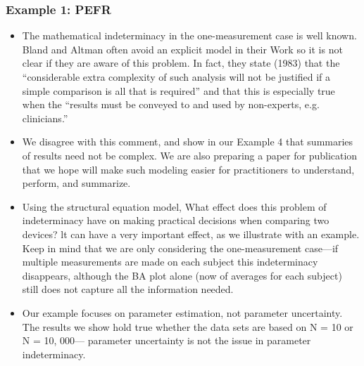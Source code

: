 \documentclass[]{article}
\title{}
\author{}
\begin{document}
\subsubsection{Example 1: PEFR}
\begin{itemize}
\item	The mathematical indeterminacy in the one-measurement case is well known. Bland
	and Altman often avoid an explicit model in their Work so it is not clear if they
	are aware of this problem. In fact, they state (1983) that the “considerable extra
	complexity of such analysis will not be justified if a simple comparison is all that is
	required” and that this is especially true when the “results must be conveyed to and
	used by non-experts, e.g. clinicians.”
\item We disagree with this comment, and show in
	our Example 4 that summaries of results need not be complex. We are also preparing a paper for publication that we hope will make such modeling easier for practitioners to understand, perform, and summarize.
	
\item Using the structural equation model, What effect does this problem of indeterminacy have on making practical decisions when comparing two devices? lt can have a very important effect, as we illustrate with an example. Keep in mind that we
	are only considering the one-measurement case—if multiple measurements are made on each subject this indeterminacy disappears, although the BA plot alone (now of averages for each subject) still does not capture all the information needed.
\item Our example focuses on parameter estimation, not parameter uncertainty. The results we show hold true whether the data sets are based on N = 10 or N = 10, 000—
	parameter uncertainty is not the issue in parameter indeterminacy.
\end{itemize}
\newpage
\end{document}
